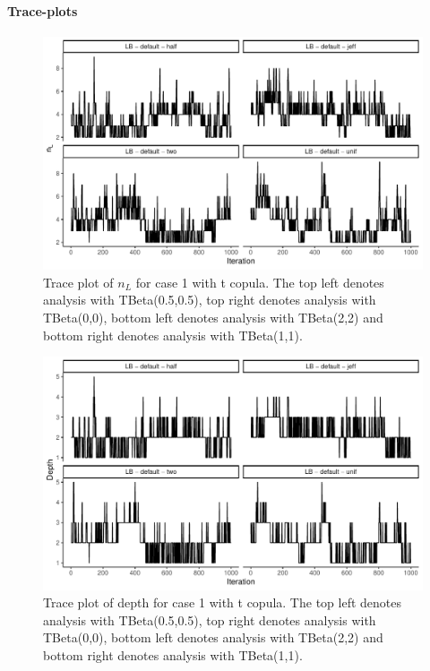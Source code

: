 \documentclass{amsart}
\begin{document}
\paragraph{Trace-plots}

\begin{figure}
	\centering
	\includegraphics[width = 0.75\linewidth]{trace_case1_t_nterm.pdf}
	\caption{Trace plot of $n_L$ for case 1 with t copula. The top left denotes analysis with TBeta(0.5,0.5), top right denotes analysis with TBeta(0,0), bottom left denotes analysis with TBeta(2,2) and bottom right denotes analysis with TBeta(1,1).}
	\label{fig:case1:t:nterm}
\end{figure}

\begin{figure}
	\centering
	\includegraphics[width = 0.75\linewidth]{trace_case1_t_depth.pdf}
	\caption{Trace plot of depth for case 1 with t copula. The top left denotes analysis with TBeta(0.5,0.5), top right denotes analysis with TBeta(0,0), bottom left denotes analysis with TBeta(2,2) and bottom right denotes analysis with TBeta(1,1).}
	\label{fig:case1:t:depth}
\end{figure}
\end{document}
